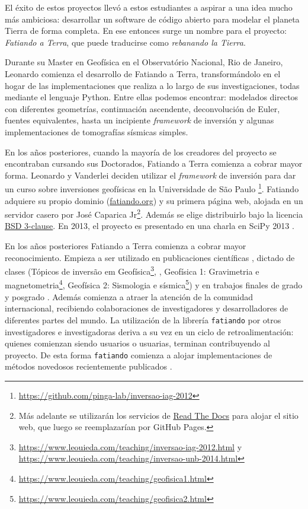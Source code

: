 El éxito de estos proyectos llevó a estos estudiantes a aspirar a una idea
mucho más ambiciosa: desarrollar un software de código abierto para modelar el
planeta Tierra de forma completa.
En ese entonces surge un nombre para el proyecto: \emph{Fatiando a Terra}, que
puede traducirse como \emph{rebanando la Tierra}.

Durante su Master en Geofísica en el Observatório Nacional, Rio de Janeiro,
Leonardo comienza el desarrollo de Fatiando a Terra, transformándolo en el
hogar de las implementaciones que realiza a lo largo de sus investigaciones,
todas mediante el lenguaje Python.
Entre ellas podemos encontrar: modelados directos con diferentes geometrías,
continuación ascendente, deconvolución de Euler, fuentes equivalentes, hasta un
incipiente \emph{framework} de inversión y algunas implementaciones de
tomografías sísmicas simples.

En los años posteriores, cuando la mayoría de los creadores del proyecto se
encontraban cursando sus Doctorados, Fatiando a Terra comienza a cobrar mayor
forma.
Leonardo y Vanderlei deciden utilizar el \emph{framework} de inversión para dar
un curso sobre inversiones geofísicas en la Universidade de São Paulo%
\footnote{\url{https://github.com/pinga-lab/inversao-iag-2012}}.
Fatiando adquiere su propio dominio
(\href{https://www.fatiando.org}{fatiando.org}) y su primera página web,
alojada en un servidor casero por José Caparica Jr\footnote{%
    Más adelante se utilizarán los servicios de
    \href{https://readthedocs.org/}{Read The Docs} para alojar el sitio web,
    que luego se reemplazarían por GitHub Pages.
}.
Además se elige distribuirlo bajo la licencia
\href{https://opensource.org/licenses/BSD-3-Clause}{BSD 3-clause}.
En 2013, el proyecto es presentado en una charla en SciPy 2013
\citep{uieda2013}.

En los años posteriores Fatiando a Terra comienza a cobrar mayor
reconocimiento. Empieza a ser utilizado en publicaciones científicas
\citep[][entre otros]{%
    uieda2012,
    carlos2014,
    oliveira2015,
    hidalgogato2015,
    carlos2016,
    reis2016,
    uieda2017,
    hidalgogato2017,
    siqueira2017%
},
dictado de clases
(Tópicos de inversão em
Geofísica\footnote{%
    \url{https://www.leouieda.com/teaching/inversao-iag-2012.html}
    y \url{https://www.leouieda.com/teaching/inversao-unb-2014.html}
},
\citet{uieda2014},
Geofísica 1: Gravimetria e magnetometria\footnote{%
    \url{https://www.leouieda.com/teaching/geofisica1.html}
},
Geofísica 2: Sismologia e sísmica\footnote{%
    \url{https://www.leouieda.com/teaching/geofisica2.html}
})
y en trabajos finales de grado y posgrado
\citep{carlos2013, sales2014, soler2015, uieda2016b, melo2020}.
Además comienza a atraer la atención de la comunidad internacional, recibiendo
colaboraciones de investigadores y desarrolladores de diferentes partes del
mundo.
La utilización de la librería \texttt{fatiando} por otros investigadores
e investigadoras deriva a su vez en un ciclo de retroalimentación: quienes
comienzan siendo usuarios o usuarias, terminan contribuyendo al proyecto.
De esta forma \texttt{fatiando} comienza a alojar implementaciones de métodos
novedosos recientemente publicados \citep{uieda2012b, oliveira2013}.

